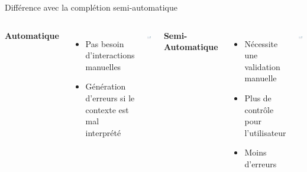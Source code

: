 \begin{frame}{Différence avec la complétion semi-automatique}
	\begin{columns}
		\textbf{Automatique}
		\begin{itemize}
			\item Pas besoin d'interactions manuelles
			\item Génération d'erreurs si le contexte est mal interprété
		\end{itemize}
		\includegraphics[width=0.9\textwidth]{images/exemple_clavier_completion_auto.png}
		
		\textbf{Semi-Automatique}
		\begin{itemize}
			\item Nécessite une validation manuelle
			\item Plus de contrôle pour l'utilisateur
			\item Moins d’erreurs
		\end{itemize}
		\includegraphics[width=0.9\textwidth]{images/exemple_clavier_completion_semi.png}
	\end{columns}
\end{frame}

